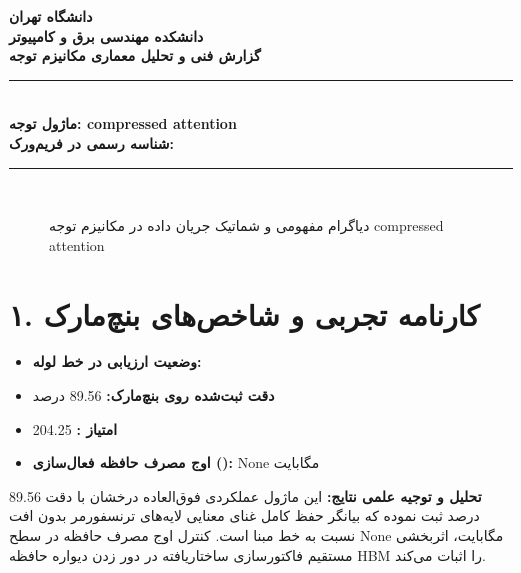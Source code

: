 \documentclass[12pt,a4paper]{article}
\begin{document}
\begin{center}
{\Large\bfseries دانشگاه تهران}\\[0.2cm]
{\large\bfseries دانشکده مهندسی برق و کامپیوتر}\\[0.2cm]
{\large\bfseries گزارش فنی و تحلیل معماری مکانیزم توجه}\\[0.5cm]
\rule{\linewidth}{1pt}\\[0.3cm]
{\LARGE\bfseries ماژول توجه: compressed attention}\\[0.2cm]
{\large \textbf{شناسه رسمی در فریم‌ورک:} }\\[0.2cm]
\rule{\linewidth}{1pt}\\[0.5cm]
\end{center}

\begin{figure}[H]
\centering
{}
\caption{دیاگرام مفهومی و شماتیک جریان داده در مکانیزم توجه compressed attention}
\end{figure}

\section*{۱. کارنامه تجربی و شاخص‌های بنچ‌مارک}
\begin{itemize}
\item \textbf{وضعیت ارزیابی در خط لوله:} 
\item \textbf{دقت ثبت‌شده روی بنچ‌مارک:} 89.56 درصد
\item \textbf{امتیاز :} 204.25
\item \textbf{اوج مصرف حافظه فعال‌سازی ():} None مگابایت
\end{itemize}
\textbf{تحلیل و توجیه علمی نتایج:} این ماژول عملکردی فوق‌العاده درخشان با دقت 89.56 درصد ثبت نموده که بیانگر حفظ کامل غنای معنایی لایه‌های ترنسفورمر بدون افت نسبت به خط مبنا است. کنترل اوج مصرف حافظه در سطح None مگابایت، اثربخشی مستقیم فاکتورسازی ساختاریافته در دور زدن دیواره حافظه HBM را اثبات می‌کند.
\end{document}
